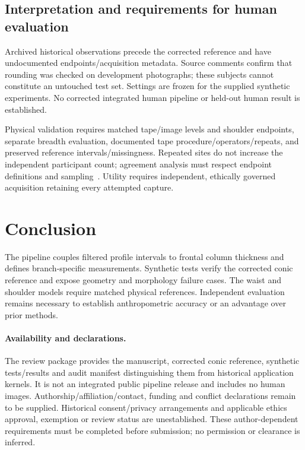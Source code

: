 \documentclass[11pt,a4paper]{article}
\begin{document}
\subsection{Interpretation and requirements for human evaluation}
Archived historical observations precede the corrected reference and have undocumented endpoints/acquisition metadata. Source comments confirm that rounding was checked on development photographs; these subjects cannot constitute an untouched test set. Settings are frozen for the supplied synthetic experiments. No corrected integrated human pipeline or held-out human result is established.

Physical validation requires matched tape/image levels and shoulder endpoints, separate breadth evaluation, documented tape procedure/operators/repeats, and preserved reference intervals/missingness. Repeated sites do not increase the independent participant count; agreement analysis must respect endpoint definitions and sampling~\cite{bland1986}. Utility requires independent, ethically governed acquisition retaining every attempted capture.

\section{Conclusion}
The pipeline couples filtered profile intervals to frontal column thickness and defines branch-specific measurements. Synthetic tests verify the corrected conic reference and expose geometry and morphology failure cases. The waist and shoulder models require matched physical references. Independent evaluation remains necessary to establish anthropometric accuracy or an advantage over prior methods.

\paragraph{Availability and declarations.}
The review package provides the manuscript, corrected conic reference, synthetic tests/results and audit manifest distinguishing them from historical application kernels. It is not an integrated public pipeline release and includes no human images. Authorship/affiliation/contact, funding and conflict declarations remain to be supplied. Historical consent/privacy arrangements and applicable ethics approval, exemption or review status are unestablished. These author-dependent requirements must be completed before submission; no permission or clearance is inferred.
\end{document}
